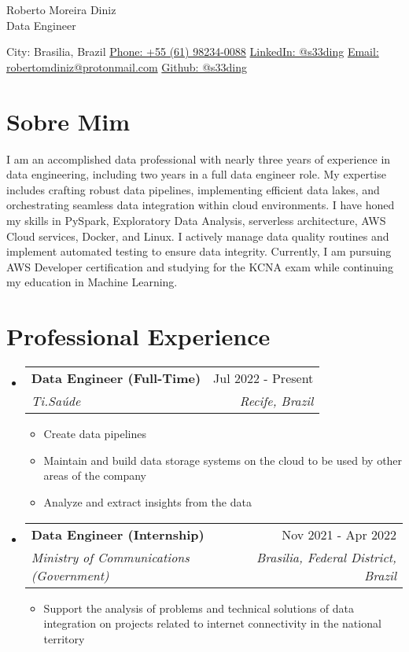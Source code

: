 \documentclass[letterpaper,11pt]{article}%
\makeatletter
\newcommand{\resumeItem}[1]{\item{#1 \vspace{-3pt}}}%
\newcommand{\resumeSubheading}[4]{\vspace{-1pt}\item\begin{tabular*}{0.97\textwidth}[t]{l@{\extracolsep{\fill}}r}\textbf{#1} & #2 \\\textit{\small #3} & \textit{\small #4} \\\end{tabular*}\vspace{-8pt}}%
\newcommand{\resumeSubHeadingListStart}{\begin{itemize}[leftmargin=0.15in, label={}, itemsep=0pt, parsep=0pt]}%
\newcommand{\resumeSubHeadingListEnd}{\end{itemize}}%
\newcommand{\resumeItemListStart}{\begin{itemize}[itemsep=0pt, parsep=0pt]}%
\newcommand{\resumeItemListEnd}{\end{itemize}\vspace{-1pt}}%
\makeatother
\begin{document}
%
\normalsize%
\section*{}%
\label{sec:}%
\begin{center}%
{\LARGE Roberto Moreira Diniz} \\ \vspace{5pt}%
{\large Data Engineer} \\ \vspace{5pt}%
\end{center}%
\begin{center}%
City: Brasilia, Brazil \quad \textbullet \quad \href{https://wa.me/qr/UYOUX2DZ7BYHI1}{Phone: +55 (61) 98234-0088} \quad \textbullet \quad \href{https://www.linkedin.com/in/s33ding/}{LinkedIn: @s33ding} \quad \textbullet \quad \href{mailto:robertomdiniz@protonmail.com}{Email: robertomdiniz@protonmail.com} \quad \textbullet \quad \href{https://github.com/s33ding}{Github: @s33ding}%
\end{center}

%
\section*{Sobre Mim}%
\label{sec:SobreMim}%
I am an accomplished data professional with nearly three years of experience in data engineering, including two years in a full data engineer role. My expertise includes crafting robust data pipelines, implementing efficient data lakes, and orchestrating seamless data integration within cloud environments. I have honed my skills in PySpark, Exploratory Data Analysis, serverless architecture, AWS Cloud services, Docker, and Linux. I actively manage data quality routines and implement automated testing to ensure data integrity. Currently, I am pursuing AWS Developer certification and studying for the KCNA exam while continuing my education in Machine Learning.

%
\section*{Professional Experience}%
\label{sec:ProfessionalExperience}%
\resumeSubHeadingListStart%
\resumeSubheading{Data Engineer (Full-Time)}{Jul 2022 - Present}{Ti.Saúde}{Recife, Brazil}%
\resumeItemListStart%
\resumeItem{Create data pipelines}%
\resumeItem{Maintain and build data storage systems on the cloud to be used by other areas of the company}%
\resumeItem{Analyze and extract insights from the data}%
\resumeItemListEnd%
\resumeSubheading{Data Engineer (Internship)}{Nov 2021 - Apr 2022}{Ministry of Communications (Government)}{Brasilia, Federal District, Brazil}%
\resumeItemListStart%
\resumeItem{Support the analysis of problems and technical solutions of data integration on projects related to internet connectivity in the national territory}%
\resumeItemListEnd%
\resumeSubHeadingListEnd
\end{document}
